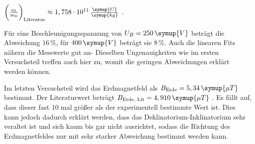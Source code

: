\begin{center}
    $\bigg( \frac{e_0}{m_0} \bigg)_\text{Literatur} \approx 1,758 \cdot 10^{11} \, \frac{\symup{C}}{\symup{kg}}$ \cite{elektron}.
\end{center}

Für eine Beschleunigungsspannung von $U_B = 250 \, \symup{V}$ beträgt die Abweichung $16 \, \%$, für $400 \, \symup{V}$ beträgt sie $8 \, \%$.
Auch die linearen Fits nähern die Messwerte gut an-
Dieselben Ungenauigkeiten wie im ersten Versuchsteil treffen auch hier zu, womit die geringen Abweichungen erklärt werden können.

Im letzten Versuchsteil wird das Erdmagnetfeld als $B_\text{Erde} = 5,34 \, \symup{\mu T}$ bestimmt.
Der Literaturwert beträgt $B_\text{Erde, Lit} = 4,910 \, \symup{\mu T}$ \cite{erdmagnet}.
Es fällt auf, dass dieser fast 10 mal größer als der experimentell bestimmte Wert ist.
Dies kann jedoch dadurch erklärt werden, dass das Deklinatorium-Inklinatorium sehr veraltet ist und sich kaum bis gar nicht ausrichtet,
sodass die Richtung des Erdmagnetfeldes nur mit sehr starker Abweichung bestimmt werden kann.